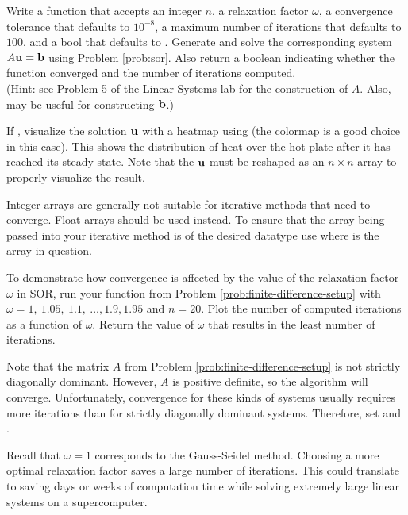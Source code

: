 \begin{problem}
Write a function that accepts an integer $n$, a relaxation factor $\omega$, a convergence tolerance  that defaults to $10^{-8}$, a maximum number of iterations  that defaults to $100$, and a bool  that defaults to .
Generate and solve the corresponding system $A\mathbf{u} = \mathbf{b}$ using Problem \ref{prob:sor}.
Also return a boolean indicating whether the function converged and the number of iterations computed.
\\ (Hint: see Problem 5 of the Linear Systems lab for the construction of $A$.
Also,  may be useful for constructing $\mathbf{b}$.)

If , visualize the solution $\mathbf{u}$ with a heatmap using  (the colormap  is a good choice in this case).
This shows the distribution of heat over the hot plate after it has reached its steady state.
Note that the $\mathbf{u}$ must be reshaped as an $n\times n$ array to properly visualize the result.
\label{prob:finite-difference-setup}
\begin{warn}
    Integer arrays are generally not suitable for iterative methods that need to converge.
    Float arrays should be used instead.
    To ensure that the array being passed into your iterative method is of the desired datatype use  where  is the array in question.
\end{warn}
\end{problem}

\begin{problem}
To demonstrate how convergence is affected by the value of the relaxation factor $\omega$ in SOR, run your function from Problem \ref{prob:finite-difference-setup} with $\omega = 1,\ 1.05,\ 1.1,\ \dots , 1.9, 1.95$ and $n = 20$.
Plot the number of computed iterations as a function of $\omega$.
Return the value of $\omega$ that results in the least number of iterations.

Note that the matrix $A$ from Problem \ref{prob:finite-difference-setup} is not strictly diagonally dominant.
However, $A$ is positive definite, so the algorithm will converge.
Unfortunately, convergence for these kinds of systems usually requires more iterations than for strictly diagonally dominant systems.
Therefore, set  and .

Recall that $\omega = 1$ corresponds to the Gauss-Seidel method.
Choosing a more optimal relaxation factor saves a large number of iterations.
This could translate to saving days or weeks of computation time while solving extremely large linear systems on a supercomputer.
\end{problem}

